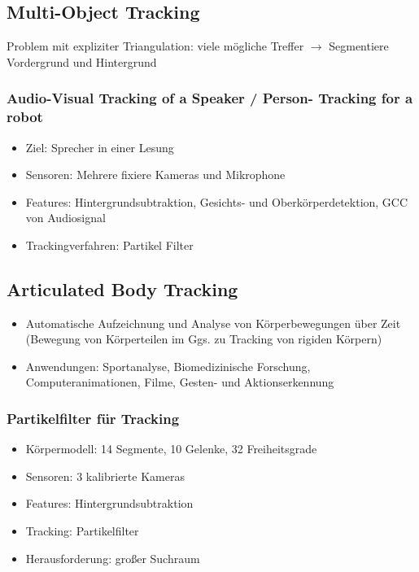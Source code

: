 \documentclass[paper=a4, fontsize=11pt]{scrartcl} %
\numberwithin{equation}{section} %
\numberwithin{figure}{section} %
\numberwithin{table}{section} %
\begin{document}
\subsection{Multi-Object Tracking}

Problem mit expliziter Triangulation: viele mögliche Treffer $\rightarrow$ Segmentiere Vordergrund und Hintergrund

\subsubsection{Audio-Visual Tracking of a Speaker / Person- Tracking for a robot}

\begin{itemize}
\item Ziel: Sprecher in einer Lesung
\item Sensoren: Mehrere fixiere Kameras und Mikrophone
\item Features: Hintergrundsubtraktion, Gesichts- und Oberkörperdetektion, GCC von Audiosignal
\item Trackingverfahren: Partikel Filter
\end{itemize}

\subsection{Articulated Body Tracking}

\begin{itemize}
\item Automatische Aufzeichnung und Analyse von Körperbewegungen über Zeit (Bewegung von Körperteilen im Ggs. zu Tracking von rigiden Körpern)
\item Anwendungen: Sportanalyse, Biomedizinische Forschung, Computeranimationen, Filme, Gesten- und Aktionserkennung
\end{itemize}

\subsubsection{Partikelfilter für Tracking}

\begin{itemize}
\item Körpermodell: 14 Segmente, 10 Gelenke, 32 Freiheitsgrade
\item Sensoren: 3 kalibrierte Kameras
\item Features: Hintergrundsubtraktion
\item Tracking: Partikelfilter
\item Herausforderung: großer Suchraum
\end{itemize}
\end{document}
